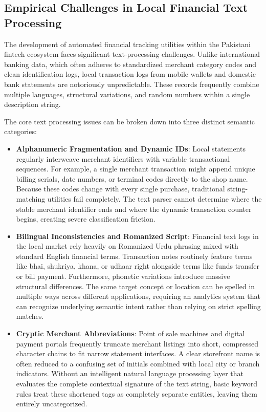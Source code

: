 \subsection{Empirical Challenges in Local Financial Text Processing}
The development of automated financial tracking utilities within the Pakistani fintech ecosystem faces significant text-processing challenges. Unlike international banking data, which often adheres to standardized merchant category codes and clean identification logs, local transaction logs from mobile wallets and domestic bank statements are notoriously unpredictable. These records frequently combine multiple languages, structural variations, and random numbers within a single description string.

The core text processing issues can be broken down into three distinct semantic categories:
\begin{itemize}
    \item \textbf{Alphanumeric Fragmentation and Dynamic IDs}: Local statements regularly interweave merchant identifiers with variable transactional sequences. For example, a single merchant transaction might append unique billing serials, date numbers, or terminal codes directly to the shop name. Because these codes change with every single purchase, traditional string-matching utilities fail completely. The text parser cannot determine where the stable merchant identifier ends and where the dynamic transaction counter begins, creating severe classification friction.
    \item \textbf{Bilingual Inconsistencies and Romanized Script}: Financial text logs in the local market rely heavily on Romanized Urdu phrasing mixed with standard English financial terms. Transaction notes routinely feature terms like bhai, shukriya, khana, or udhaar right alongside terms like funds transfer or bill payment. Furthermore, phonetic variations introduce massive structural differences. The same target concept or location can be spelled in multiple ways across different applications, requiring an analytics system that can recognize underlying semantic intent rather than relying on strict spelling matches.
    \item \textbf{Cryptic Merchant Abbreviations}: Point of sale machines and digital payment portals frequently truncate merchant listings into short, compressed character chains to fit narrow statement interfaces. A clear storefront name is often reduced to a confusing set of initials combined with local city or branch indicators. Without an intelligent natural language processing layer that evaluates the complete contextual signature of the text string, basic keyword rules treat these shortened tags as completely separate entities, leaving them entirely uncategorized.
\end{itemize}
